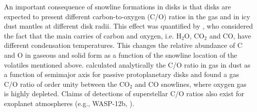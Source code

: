 \documentclass[apj]{emulateapj}
\newcommand{\emgr}[1]{\emph{ \color{gray} #1}}
\begin{document}
An important consequence of snowline formations in disks is that disks are expected to present different carbon-to-oxygen (C/O) ratios in the gas and in icy dust mantles at different disk radii. This effect was quantified by  \citet{oberg11}, who considered the fact that the main carries of carbon and oxygen, i.e. H$_2$O, CO$_2$ and CO, have different condensation temperatures. This changes the relative abundance of C and O in gaseous and solid form as a function of the snowline location of the volatiles mentioned above. \citet{oberg11} calculated analytically the C/O ratio in gas in dust as a function of semimajor axis for passive protoplanetary disks and found a gas C/O ratio of order unity between the CO$_2$ and CO snowlines, where oxygen gas is highly depleted. Claims of detections of superstellar C/O ratios also exist for exoplanet atmospheres 
(e.g., WASP-12b, \citealt{madhu11}).


\end{document}
